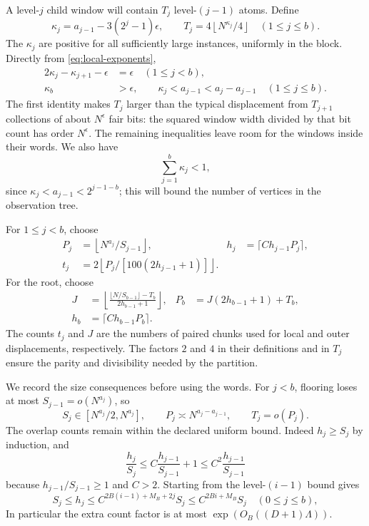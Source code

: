 A level-$j$ child window will contain $T_j$ level-$(j-1)$ atoms.  Define
\[
 \kappa_j=a_{j-1}-3(2^j-1)\epsilon,
 \qquad T_j=4\left\lfloor N^{\kappa_j}/4\right\rfloor
       \quad(1\le j\le b).
\]
The $\kappa_j$ are positive for all sufficiently large instances, uniformly in the block.  Directly from \eqref{eq:local-exponents},
\begin{equation}\label{eq:kj}
\begin{aligned}
 2\kappa_j-\kappa_{j+1}-\epsilon&=\epsilon\quad(1\le j<b),\\
 \kappa_b&>\epsilon,\qquad
 \kappa_j<a_{j-1}<a_j-a_{j-1}\quad(1\le j\le b).
\end{aligned}
\end{equation}
The first identity makes $T_j$ larger than the typical displacement from $T_{j+1}$ collections of about $N^\epsilon$ fair bits: the squared window width divided by that bit count has order $N^\epsilon$.  The remaining inequalities leave room for the windows inside their words.  We also have
\begin{equation}\label{eq:power_gap}
 \sum_{j=1}^b\kappa_j<1,
\end{equation}
since $\kappa_j<a_{j-1}<2^{j-1-b}$; this will bound the number of vertices in the observation tree.

For $1\le j<b$, choose
\[
\begin{aligned}
 P_j&=\left\lfloor N^{a_j}/S_{j-1}\right\rfloor,
 &h_j&=\lceil C h_{j-1}P_j\rceil,\\
 t_j&=2\left\lfloor P_j/[100(2h_{j-1}+1)]\right\rfloor.
\end{aligned}
\]
For the root, choose
\[
\begin{aligned}
 J&=\left\lfloor\frac{\lfloor N/S_{b-1}\rfloor-T_b}
                         {2h_{b-1}+1}\right\rfloor,
 &P_b&=J(2h_{b-1}+1)+T_b,\\
 h_b&=\lceil C h_{b-1}P_b\rceil.
\end{aligned}
\]
The counts $t_j$ and $J$ are the numbers of paired chunks used for local and outer displacements, respectively.  The factors $2$ and $4$ in their definitions and in $T_j$ ensure the parity and divisibility needed by the partition.

We record the size consequences before using the words.  For $j<b$, flooring loses at most $S_{j-1}=o(N^{a_j})$, so
\[
 S_j\in[N^{a_j}/2,N^{a_j}],\qquad
 P_j\asymp N^{a_j-a_{j-1}},\qquad T_j=o(P_j).
\]
The overlap counts remain within the declared uniform bound.  Indeed $h_j\ge S_j$ by induction, and
\[
 \frac{h_j}{S_j}\le C\frac{h_{j-1}}{S_{j-1}}+1
       \le C^2\frac{h_{j-1}}{S_{j-1}}
\]
because $h_{j-1}/S_{j-1}\ge1$ and $C>2$.  Starting from the level-$(i-1)$ bound gives
\begin{equation}\label{eq:nested-counts}
 S_j\le h_j\le C^{2B(i-1)+M_B+2j}S_j
             \le C^{2Bi+M_B}S_j\quad(0\le j\le b),
\end{equation}
In particular the extra count factor is at most $\exp(O_B((D+1)\Lambda))$.

